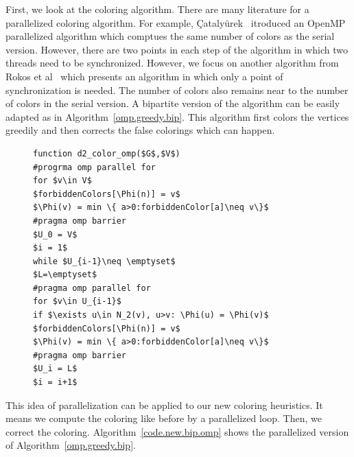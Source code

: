 \documentclass[11pt, twoside,a4paper]{book}
\newcommand{\coderef}[1]{Algorithm~\protect\ref{#1}}
\begin{document}
First, we look at the coloring algorithm.
There are many literature for a parallelized coloring algorithm.
For example,
{\c{C}}ataly{\"{u}}rek~\cite{cataly2012} itroduced an OpenMP parallelized
algorithm which comptues the same number of colors as the serial version.
However, there are two points in each step of the algorithm in which two threads
need to be synchronized.
However, we focus on another algorithm from Rokos et al~\cite{Rokos2015}
which presents an algorithm in which only a point of synchronization is
needed. The number of colors also remains near to the number of colors
in the serial version. A bipartite version of the algorithm can be easily
adapted as in \coderef{omp.greedy.bip}. This algorithm first colors the vertices
greedily and then corrects the false colorings which can happen.
\begin{figure}
\begin{lstlisting}[caption=A OpenMP parallelized version of greedy algorithm
adapted for the bipartite graph.,label=omp.greedy.bip,mathescape]
function d2_color_omp($G$,$V$)
#progrma omp parallel for
for $v\in V$
$forbiddenColors[\Phi(n)] = v$
$\Phi(v) = min \{ a>0:forbiddenColor[a]\neq v\}$
#pragma omp barrier
$U_0 = V$
$i = 1$
while $U_{i-1}\neq \emptyset$
$L=\emptyset$
#pragma omp parallel for
for $v\in U_{i-1}$
if $\exists u\in N_2(v), u>v: \Phi(u) = \Phi(v)$
$forbiddenColors[\Phi(n)] = v$
$\Phi(v) = min \{ a>0:forbiddenColor[a]\neq v\}$
#pragma omp barrier
$U_i = L$
$i = i+1$
\end{lstlisting}
\end{figure}
This idea of parallelization can be applied to our new coloring heuristics.
It means we compute the coloring like before by a parallelized loop.
Then, we correct the coloring. \coderef{code.new.bip.omp} shows the parallelized
version of \coderef{omp.greedy.bip}.
\end{document}
